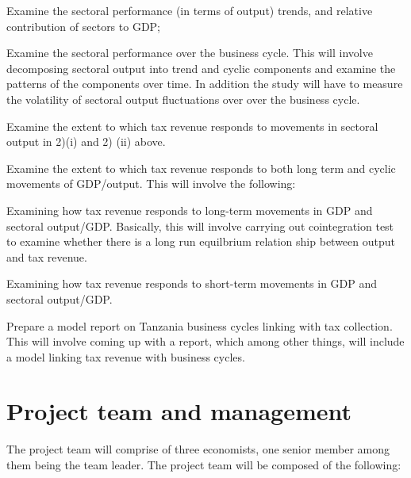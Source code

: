 \documentclass[12pt,a4paper,final]{article}
\begin{document}
\begin{compactenum}[1)]
\begin{compactenum}[(i)]
\item	Examine the sectoral performance (in terms of output) trends, and relative contribution of sectors to GDP;

\item	Examine the sectoral performance over the business cycle.  This will involve decomposing sectoral output into trend and cyclic components and examine the patterns of the components over time.  In addition the study will have to measure the volatility of sectoral output fluctuations over over the business cycle. 

\item Examine the extent to which tax revenue responds to movements in sectoral output in 2)(i) and 2) (ii) above. 

\end{compactenum}

\item 	Examine the extent to which tax revenue responds to both long term and cyclic movements of GDP/output. This will involve the following:

\begin{compactenum}[(i)]
\item	Examining how tax revenue responds to long-term movements in GDP and sectoral output/GDP. Basically, this will involve carrying out cointegration test to examine whether there is a long run equilbrium relation ship between output and tax revenue.

\item Examining how tax revenue responds to short-term movements in GDP and sectoral output/GDP.  
\end{compactenum}

\item Prepare a model report on Tanzania business cycles linking with tax collection.  This will involve coming up with a report, which among other things, will include a model linking tax revenue with business cycles.
 
\end{compactenum}

\section{Project team and management}

The project team will comprise of three economists, one senior member among them being the team leader. The project team will be composed of the following:
\end{document}
